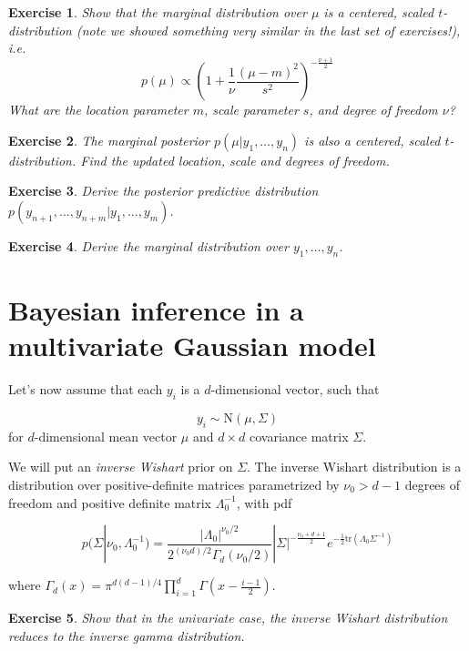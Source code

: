 \documentclass[twoside]{article}
\newcounter{lecnum}
\newtheorem{exercise}{Exercise}[lecnum]
\begin{document}
\begin{exercise}
  Show that the marginal distribution over $\mu$ is a centered, scaled $t$-distribution (note we showed something very similar in the last set of exercises!), i.e.\
  $$p(\mu) \propto \left(1+\frac{1}{\nu}\frac{(\mu-m)^2}{s^2}\right)^{-\frac{\nu+1}{2}}$$
  What are the location parameter $m$, scale parameter $s$, and degree of freedom $\nu$?
\end{exercise}

\begin{exercise}
  The marginal posterior $p(\mu|y_1,\dots, y_n)$ is also a centered, scaled $t$-distribution. Find the updated location, scale and degrees of freedom.
\end{exercise}

\begin{exercise}
  Derive the posterior predictive distribution $p(y_{n+1},\dots, y_{n+m}|y_1,\dots, y_{m})$.
\end{exercise}

\begin{exercise}
  Derive the marginal distribution over $y_1,\dots, y_n$.
\end{exercise}





\section{Bayesian inference in a multivariate Gaussian model}

Let's now assume that each $y_i$ is a $d$-dimensional vector, such that

$$y_i \sim \mbox{N}(\mu, \Sigma)$$
for $d$-dimensional mean vector $\mu$ and $d\times d$ covariance matrix $\Sigma$.

We will put an \textit{inverse Wishart} prior on $\Sigma$. The inverse Wishart distribution is a distribution over positive-definite matrices parametrized by $\nu_0>d-1$ degrees of freedom and  positive definite matrix $\Lambda_0^{-1}$, with pdf

$$p(\Sigma|\nu_0, \Lambda_0^{-1}) = \frac{|\Lambda_0|^{\nu_0/2}}{2^{(\nu_0 d)/2}\Gamma_d(\nu_0/2)}|\Sigma|^{-\frac{\nu_0+d+1}{2}}e^{-\frac{1}{2}\mbox{tr}(\Lambda_0\Sigma^{-1})}$$

where
$\Gamma_d(x) = \pi^{d(d-1)/4}\prod_{i=1}^d\Gamma\left(x-\frac{i-1}{2}\right)$.
\begin{exercise}
  Show that in the univariate case, the inverse Wishart distribution reduces to the inverse gamma distribution.
\end{exercise}
\end{document}
